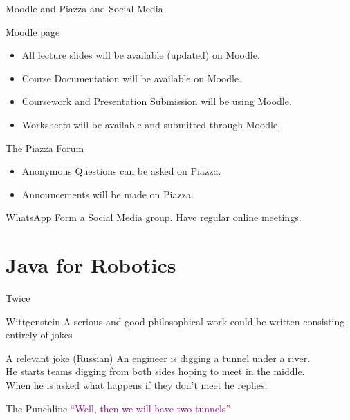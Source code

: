\documentclass[color=pdftex,usenames,dvipsnames, aspectratio=169]{beamer}
\begin{document}
\begin{frame}{Moodle and Piazza and Social Media}
\begin{block}{Moodle page}
\begin{itemize}
\item All lecture slides will be available (updated) on Moodle.
\item Course Documentation will be available on Moodle.
\item Coursework and Presentation Submission will be using Moodle.
\item Worksheets will be available and submitted through Moodle.
\end{itemize}
\end{block}

\begin{block}{The Piazza Forum}
\begin{itemize}
\item Anonymous Questions can be asked on Piazza.
\item Announcements will be made on Piazza.
\end{itemize}
\end{block}

\begin{alertblock}{WhatsApp\texttrademark}
Form a Social Media group.  Have regular online meetings.
\end{alertblock}
\end{frame}

\section{Java for Robotics}

\begin{frame}{Twice}
\begin{block}{Wittgenstein}
\textcolor{OliveGreen}{A serious and good philosophical work could be written consisting entirely of jokes}
\end{block}
\pause
\begin{block}{A relevant joke (Russian)}
An engineer is digging a tunnel under a river.\\
 He starts teams digging from both sides hoping to meet in the middle.\\
  When he is asked what happens if they don't meet  he replies:
\end{block}
\pause
\begin{block}{The Punchline}
\textcolor{purple}{``Well, then we will have two tunnels''}
\end{block}

\end{frame}
\end{document}

